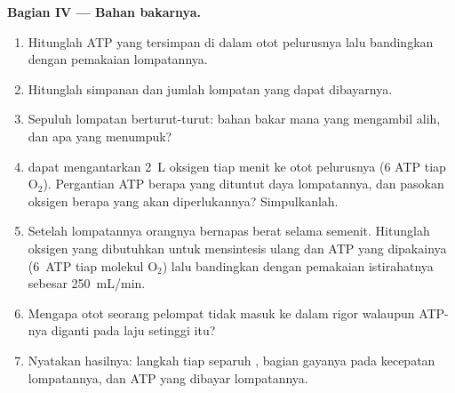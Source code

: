 \begin{problem}
\medskip
\noindent\textbf{Bagian IV --- Bahan bakarnya.}
\begin{enumerate}[resume]
  \item Hitunglah ATP yang tersimpan di dalam otot pelurusnya lalu
        bandingkan dengan pemakaian lompatannya.
  \item Hitunglah simpanan  dan jumlah lompatan yang
        dapat dibayarnya.
  \item Sepuluh lompatan berturut-turut: bahan bakar mana yang
        mengambil alih, dan apa yang menumpuk?
  \item {} dapat mengantarkan \qty{2}{L} oksigen tiap menit ke
        otot pelurusnya (6 ATP tiap $\mathrm{O_2}$). Pergantian ATP
        berapa yang dituntut daya lompatannya, dan pasokan oksigen
        berapa yang akan diperlukannya? Simpulkanlah.
  \item Setelah lompatannya orangnya bernapas berat selama semenit.
        Hitunglah oksigen yang dibutuhkan untuk mensintesis ulang
         dan ATP yang dipakainya (\qty{6}{ATP} tiap
        molekul $\mathrm{O_2}$) lalu bandingkan dengan pemakaian
        istirahatnya sebesar \qty{250}{mL/min}.
  \item Mengapa otot seorang pelompat tidak masuk ke dalam rigor
        walaupun ATP-nya diganti pada laju setinggi itu?
  \item Nyatakan hasilnya: langkah tiap separuh , bagian
        gayanya pada kecepatan lompatannya, dan ATP yang dibayar
        lompatannya.
\end{enumerate}
\end{problem}
